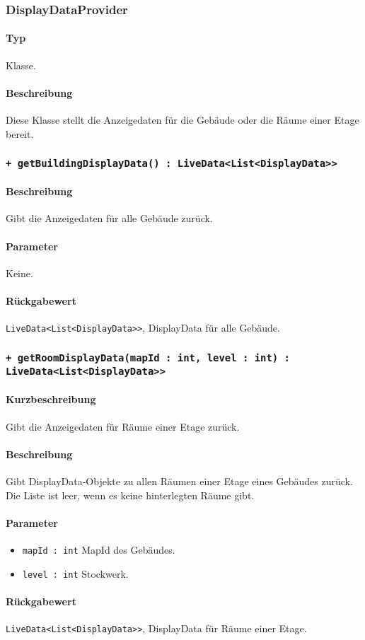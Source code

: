 \subsubsection{DisplayDataProvider}\label{App_Map_Model_DisplayDataProvider}
\paragraph*{Typ}
Klasse.
\paragraph*{Beschreibung}
Diese Klasse stellt die Anzeigedaten für die Gebäude oder die Räume einer Etage bereit.

\subsubsection*{\texttt{+ getBuildingDisplayData() : LiveData<List<DisplayData>>}}\label{App_Map_Model_getBuildingDisplayData_Display}%
\paragraph*{Beschreibung}
Gibt die Anzeigedaten für alle Gebäude zurück.
\paragraph*{Parameter}
Keine.
\paragraph*{Rückgabewert}
\texttt{LiveData<List<DisplayData>>}, DisplayData für alle Gebäude.

\subsubsection*{\texttt{+ getRoomDisplayData(mapId : int, level : int) : LiveData<List<DisplayData>>}}\label{App_Map_Model_getRoomDisplayData_Display}%
\paragraph*{Kurzbeschreibung}
Gibt die Anzeigedaten für Räume einer Etage zurück.
\paragraph*{Beschreibung}
Gibt DisplayData-Objekte zu allen Räumen einer Etage eines Gebäudes zurück.\\
Die Liste ist leer, wenn es keine hinterlegten Räume gibt.
\paragraph*{Parameter}
\begin{itemize}
    \item \texttt{mapId : int} MapId des Gebäudes.
    \item \texttt{level : int} Stockwerk.
\end{itemize}
\paragraph*{Rückgabewert}
\texttt{LiveData<List<DisplayData>>}, DisplayData für Räume einer Etage.